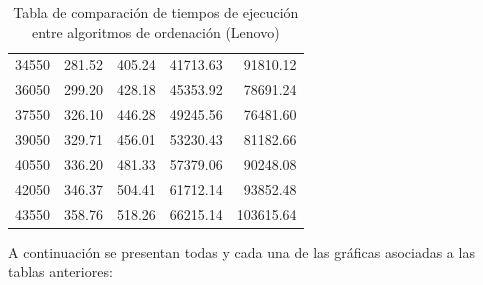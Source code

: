 \documentclass{homework}
\begin{document}
\begin{table}[H]
\begin{tabular}{|r|r|r|r|r|}
            34550 & 281.52 & 405.24 & 41713.63 & 91810.12 \\ 
            36050 & 299.20 & 428.18 & 45353.92 & 78691.24 \\ 
            37550 & 326.10 & 446.28 & 49245.56 & 76481.60 \\ 
            39050 & 329.71 & 456.01 & 53230.43 & 81182.66 \\ 
            40550 & 336.20 & 481.33 & 57379.06 & 90248.08 \\ 
            42050 & 346.37 & 504.41 & 61712.14 & 93852.48 \\ 
            43550 & 358.76 & 518.26 & 66215.14 & 103615.64 \\ 
            \hline
        \end{tabular}
        \caption{Tabla de comparación de tiempos de ejecución entre algoritmos de ordenación (Lenovo)}

    \end{table}

    A continuación se presentan todas y cada una de las gráficas asociadas a las tablas anteriores:
\end{document}
